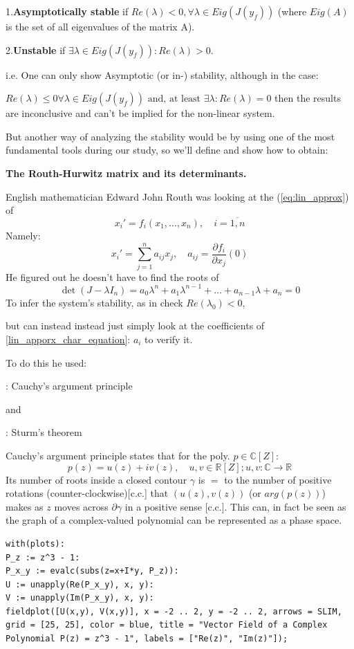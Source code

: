 1.\textbf{Asymptotically stable} if $Re(\lambda) < 0, \forall \lambda \in Eig(J(y_f))$ (where $Eig(A)$ is the set of all eigenvalues of the matrix A).

2.\textbf{Unstable} if $\exists \lambda \in Eig(J(y_f)) : Re(\lambda)> 0$.

i.e. One can only show Asymptotic (or in-) stability, although in the case:

$Re(\lambda) \leqslant  0 \forall \lambda \in Eig(J(y_f)) \text{ and,
at least } \exists \lambda : Re(\lambda) = 0$ then the results are
inconclusive and can't be implied for the non-linear system.

\hfill\break

But another way of analyzing the stability would be by using one of
the most fundamental tools during our study, so we'll define and show
how to obtain:

\textbf{The Routh-Hurwitz matrix and its determinants.} \cite{hairer1993Nonstiff}

English mathematician Edward John Routh was looking at the
(\ref{eq:lin_approx}) of
\[
x_i' = f_i(x_1,\dots , x_n), \quad i = \overline{1,n}
\]
Namely:
\[
x_i' =\sum_{j=1}^{n}a_{ij} x_j, \quad a_{ij} = \frac{\partial
f_i}{\partial x_j}(0)
\]
He figured out he doesn't have to find the roots of
\begin{equation}\label{lin_apporx_char_equation}
\det(J - \lambda I_n) =
a_0 \lambda^n + a_1 \lambda^{n-1} + \dots + a_{n-1}\lambda + a_n = 0
\end{equation}
To infer the system's stability, as in check
$ Re(\lambda_0) < 0$,

but can instead instead just simply look at the coefficients of
\ref{lin_apporx_char_equation}: $a_{i}$ to verify it.

To do this he used:

: Cauchy's argument principle

and

: Sturm's theorem


Cauchy's argument principle states that for the poly. $p \in \mathbb{C}[Z]$:
\[
p(z) = u(z) + i v(z), \quad u, v \in \mathbb{R}[Z]; u,v : \mathbb{C}
\rightarrow \mathbb{R}
\]
Its number of roots inside a closed contour $\gamma$  is $=$ to the
number of positive rotations (counter-clockwise)[c.c.] that $(u(z),
v(z))$ (or $arg(p(z))$) makes as $z$ moves across $\partial \gamma$
in a positive sense [c.c.].
This can, in fact be seen as the graph of a complex-valued polynomial can be represented as a phase space.
\begin{verbatim}
with(plots):
P_z := z^3 - 1:
P_x_y := evalc(subs(z=x+I*y, P_z)):
U := unapply(Re(P_x_y), x, y):
V := unapply(Im(P_x_y), x, y):
fieldplot([U(x,y), V(x,y)], x = -2 .. 2, y = -2 .. 2, arrows = SLIM, grid = [25, 25], color = blue, title = "Vector Field of a Complex Polynomial P(z) = z^3 - 1", labels = ["Re(z)", "Im(z)"]);
\end{verbatim}

